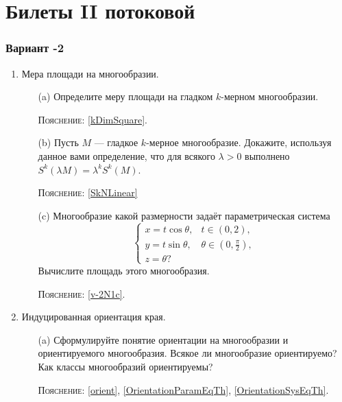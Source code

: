 \documentclass[a5paper]{article}
\theoremstyle{plain}
\theoremstyle{definition}
\numberwithin{through}{section}
\numberwithin{equation}{section}
\begin{document}
\newpage
\section{Билеты II потоковой}
\subsubsection{Вариант -2}

\begin{enumerate}
	\item 
	Мера площади на многообразии. 
	
	\begin{itemize}
		\item[(a)]
		Определите меру площади на гладком $k$-мерном многообразии.
		
		\textsc{Пояснение:}  \ref{kDimSquare}.
		
		\item[(b)]
		Пусть $M$ --- гладкое $k$-мерное многообразие. Докажите,
		используя данное вами определение, что для всякого 
		$\lambda > 0$ выполнено $S^k(\lambda M) = \lambda^k S^k(M)$.
		
		\textsc{Пояснение:} \ref{SkNLinear}
		
		\item[(c)]
		Многообразие какой размерности задаёт параметрическая система
		\begin{equation*}
			\begin{cases}
			x = t\cos \theta, & t \in (0, 2), \\
			y = t\sin \theta, & \theta \in (0, \frac{\pi}{2}), \\
			z = \theta ?
			\end{cases}
		\end{equation*}
		Вычислите площадь этого многообразия.
		
		\textsc{Пояснение:} \ref{v-2N1c}.
		
	\end{itemize}

	\item
	Индуцированная ориентация края.
	
	\begin{itemize}
		\item[(a)]
		Сформулируйте понятие ориентации на многообразии и
		ориентируемого многообразия. Всякое ли многообразие
		ориентируемо? Как классы многообразий ориентируемы?
		
		\textsc{Пояснение:} \ref{orient}, \ref{OrientationParamEqTh}, \ref{OrientationSysEqTh}.
		

\end{itemize}
\end{enumerate}
\end{document}
